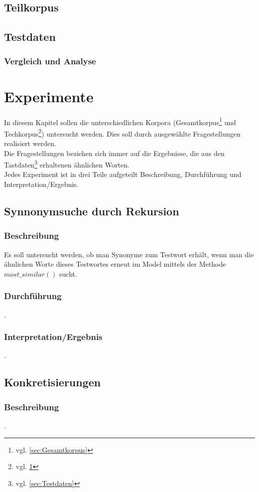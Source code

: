 \documentclass[12pt,a4paper]{report}
\begin{document}
	\section{Teilkorpus}
	\label{sec:Teilkorpus}	
	\section{Testdaten}
	\subsection{Vergleich und Analyse}
\newpage
\chapter{Experimente}
In diesem Kapitel sollen die unterschiedlichen Korpora (Gesamtkorpus\footnote{vgl. \ref{sec:Gesamtkorpus}} und Techkorpus\footnote{vgl. \ref{sec:Teilkorpus}}) untersucht werden. Dies soll durch ausgewählte Fragestellungen realisiert werden.
\\Die Fragestellungen beziehen sich immer auf die Ergebnisse, die aus den Tastdaten\footnote{vgl. \ref{sec:Testdaten}} erhaltenen ähnlichen Worten.
\\Jedes Experiment ist in drei Teile aufgeteilt Beschreibung, Durchführung und Interpretation/Ergebnis.
	\section{Synnonymsuche durch Rekursion}
		\subsection{Beschreibung}
		Es soll untersucht werden, ob man Synonyme zum Testwort erhält, wenn man die ähnlichen Worte dieses Testwortes erneut im Model mittels der Methode $most\_similar()$ sucht. 
		\subsection{Durchführung}
		.
		\subsection{Interpretation/Ergebnis}
		.
	\newpage
	\section{Konkretisierungen}
		\subsection{Beschreibung}
		.
\end{document}
